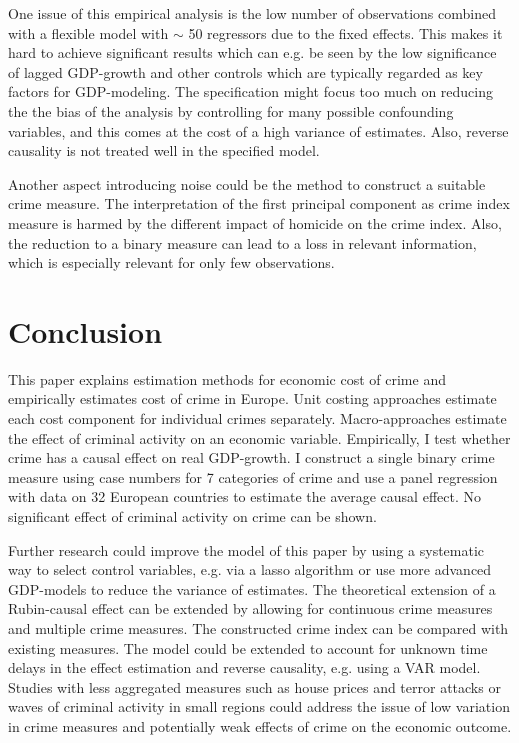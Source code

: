 \documentclass[a4paper,12pt]{article}
\begin{document}
One issue of this empirical analysis is the low number of observations combined with a flexible model with $\sim$ 50 regressors due to the fixed effects. This makes it hard to achieve significant results which can e.g. be seen by the low significance of lagged GDP-growth and other controls which are typically regarded as key factors for GDP-modeling. The specification might focus too much on reducing the the bias of the analysis by controlling for many possible confounding variables, and this comes at the cost of a high variance of estimates. Also, reverse causality is not treated well in the specified model. 

Another aspect introducing noise could be the method to construct a suitable crime measure. 
The interpretation of the first principal component as crime index measure is harmed by the different impact of homicide on the crime index. Also, the reduction to a binary measure can lead to a loss in relevant information, which is especially  relevant for only few observations.


\section{Conclusion}
\label{Conclusion}
This paper explains estimation methods for economic cost of crime and empirically estimates cost of crime in Europe. 
Unit costing approaches estimate each cost component for individual crimes separately. Macro-approaches estimate the effect of criminal activity on an economic variable. Empirically, I test whether crime has a causal effect on real GDP-growth. I construct a single binary crime measure using case numbers for 7 categories of crime and use a panel regression with data on 32 European countries to estimate the average causal effect. No significant effect of criminal activity on crime can be shown.

Further research could improve the model of this paper by using a systematic way to select control variables, e.g. via a lasso algorithm or use more advanced GDP-models to reduce the variance of estimates. The theoretical extension of a Rubin-causal effect can be extended by allowing for continuous crime measures and multiple crime measures. 
The constructed crime index can be compared with existing measures.
The model could be extended to account for unknown time delays in the effect estimation and reverse causality, e.g. using a VAR model.
Studies with less aggregated measures such as house prices and terror attacks or waves of criminal activity in small regions could address the issue of low variation in crime measures and potentially weak effects of crime on the economic outcome.
 
\end{document}
